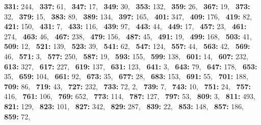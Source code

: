\textbf{331:} 244,\allowbreak~ 
\textbf{337:} 61,\allowbreak~ 
\textbf{347:} 17,\allowbreak~ 
\textbf{349:} 30,\allowbreak~ 
\textbf{353:} 132,\allowbreak~ 
\textbf{359:} 26,\allowbreak~ 
\textbf{367:} 19,\allowbreak~ 
\textbf{373:} 32,\allowbreak~ 
\textbf{379:} 15,\allowbreak~ 
\textbf{383:} 89,\allowbreak~ 
\textbf{389:} 134,\allowbreak~ 
\textbf{397:} 165,\allowbreak~ 
\textbf{401:} 347,\allowbreak~ 
\textbf{409:} 176,\allowbreak~ 
\textbf{419:} 82,\allowbreak~ 
\textbf{421:} 150,\allowbreak~ 
\textbf{431:} 7,\allowbreak~ 
\textbf{433:} 116,\allowbreak~ 
\textbf{439:} 97,\allowbreak~ 
\textbf{443:} 44,\allowbreak~ 
\textbf{449:} 17,\allowbreak~ 
\textbf{457:} 23,\allowbreak~ 
\textbf{461:} 274,\allowbreak~ 
\textbf{463:} 46,\allowbreak~ 
\textbf{467:} 238,\allowbreak~ 
\textbf{479:} 156,\allowbreak~ 
\textbf{487:} 45,\allowbreak~ 
\textbf{491:} 19,\allowbreak~ 
\textbf{499:} 168,\allowbreak~ 
\textbf{503:} 41,\allowbreak~ 
\textbf{509:} 12,\allowbreak~ 
\textbf{521:} 139,\allowbreak~ 
\textbf{523:} 39,\allowbreak~ 
\textbf{541:} 62,\allowbreak~ 
\textbf{547:} 124,\allowbreak~ 
\textbf{557:} 44,\allowbreak~ 
\textbf{563:} 42,\allowbreak~ 
\textbf{569:} 46,\allowbreak~ 
\textbf{571:} 3,\allowbreak~ 
\textbf{577:} 250,\allowbreak~ 
\textbf{587:} 19,\allowbreak~ 
\textbf{593:} 155,\allowbreak~ 
\textbf{599:} 138,\allowbreak~ 
\textbf{601:} 14,\allowbreak~ 
\textbf{607:} 232,\allowbreak~ 
\textbf{613:} 327,\allowbreak~ 
\textbf{617:} 227,\allowbreak~ 
\textbf{619:} 137,\allowbreak~ 
\textbf{631:} 123,\allowbreak~ 
\textbf{641:} 3,\allowbreak~ 
\textbf{643:} 79,\allowbreak~ 
\textbf{647:} 178,\allowbreak~ 
\textbf{653:} 35,\allowbreak~ 
\textbf{659:} 104,\allowbreak~ 
\textbf{661:} 92,\allowbreak~ 
\textbf{673:} 35,\allowbreak~ 
\textbf{677:} 28,\allowbreak~ 
\textbf{683:} 153,\allowbreak~ 
\textbf{691:} 55,\allowbreak~ 
\textbf{701:} 188,\allowbreak~ 
\textbf{709:} 86,\allowbreak~ 
\textbf{719:} 43,\allowbreak~ 
\textbf{727:} 232,\allowbreak~ 
\textbf{733:} 72, 2,\allowbreak~ 
\textbf{739:} 7,\allowbreak~ 
\textbf{743:} 10,\allowbreak~ 
\textbf{751:} 24,\allowbreak~ 
\textbf{757:} 416,\allowbreak~ 
\textbf{761:} 106,\allowbreak~ 
\textbf{769:} 652,\allowbreak~ 
\textbf{773:} 114,\allowbreak~ 
\textbf{787:} 127,\allowbreak~ 
\textbf{797:} 53,\allowbreak~ 
\textbf{809:} 3,\allowbreak~ 
\textbf{811:} 493,\allowbreak~ 
\textbf{821:} 129,\allowbreak~ 
\textbf{823:} 101,\allowbreak~ 
\textbf{827:} 342,\allowbreak~ 
\textbf{829:} 287,\allowbreak~ 
\textbf{839:} 22,\allowbreak~ 
\textbf{853:} 148,\allowbreak~ 
\textbf{857:} 186,\allowbreak~ 
\textbf{859:} 72,\allowbreak~ 
